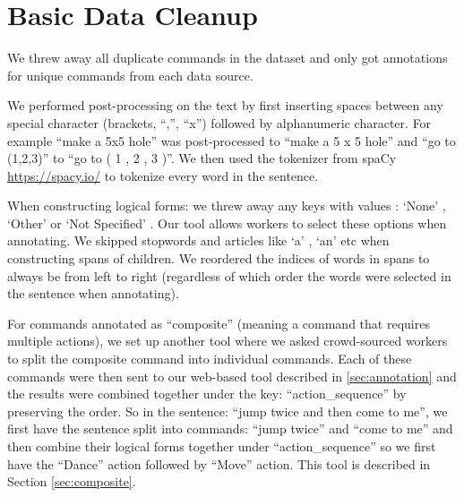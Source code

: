 \section{Basic Data Cleanup}
\label{sec:data_cleanup}
We threw away all duplicate commands in the dataset and only got annotations for unique commands from each data source.

We performed post-processing on the text by first inserting spaces between any special character (brackets, ``,'', ``x'') followed by alphanumeric character. For example ``make a 5x5 hole'' was post-processed to ``make a 5 x 5 hole'' and ``go to (1,2,3)'' to ``go to ( 1 , 2 , 3 )''. We then used the tokenizer from spaCy \url{https://spacy.io/}  to tokenize every word in the sentence.

When constructing logical forms: we threw away any keys with values : `None' , `Other' or `Not Specified' . Our tool allows workers to select these options when annotating. We skipped stopwords and articles like `a' , `an' etc when constructing spans of children. We reordered the indices of words in spans to always be from left to right (regardless of which order the words were selected in the sentence when annotating).

For commands annotated as ``composite'' (meaning a command that requires multiple actions), we set up another tool where we asked crowd-sourced workers to split the composite command into individual commands. Each of these commands were then sent to our web-based tool described in \ref{sec:annotation} and the results were combined together under the key: ``action\_sequence'' by preserving the order. So in the sentence: ``jump twice and then come to me'', we first have the sentence split into commands: ``jump twice'' and ``come to me'' and then combine  their logical forms together under ``action\_sequence'' so we first have the ``Dance'' action followed by ``Move'' action. This tool is described in Section \ref{sec:composite}.